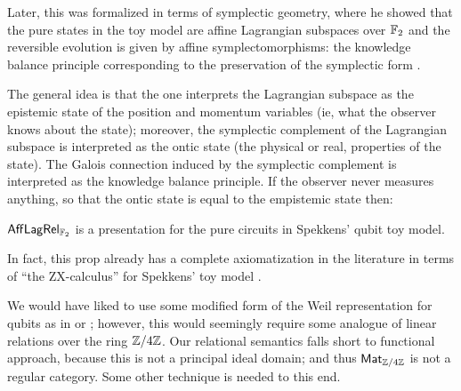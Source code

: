 Later, this was formalized in terms of symplectic geometry, where he showed that the pure states in the toy model are affine Lagrangian subspaces over $\mathbb{F}_2$ and the reversible evolution is given by affine symplectomorphisms: the knowledge balance principle corresponding to the preservation of the symplectic form \cite{spekkens2016quasi}. 

 The general idea is that the one interprets the Lagrangian subspace as the epistemic state of the position and momentum variables (ie, what the observer knows about the state); moreover, the symplectic complement of the Lagrangian subspace is interpreted as the ontic state (the physical or real, properties of the state).  The Galois connection induced by the symplectic complement is interpreted as the knowledge balance principle.  If the observer never measures anything, so that the ontic state is equal to the empistemic state then:
\begin{corollary}
$\mathsf{Aff}\mathsf{Lag}\mathsf{Rel}_{\mathbb{F}_2}$ is a presentation for the pure circuits in Spekkens' qubit toy model.
\end{corollary}
In fact, this prop  already has a complete axiomatization in the literature in terms of ``the ZX-calculus'' for Spekkens' toy model \cite{backensspek}. %

We would have liked to use some modified form of the Weil representation for qubits as in \cite[\S 3.3]{heinrich2021stabiliser} or \cite{niel}; however, this would seemingly require some analogue of linear relations over the ring $\mathbb{Z}/4\mathbb{Z}$.   Our relational semantics falls short to functional approach, because this is not a principal ideal domain; and thus $\mathsf{Mat}_{\mathbb{Z}/4\mathbb{Z}}$ is not a regular category.  Some other technique is needed to this end.



